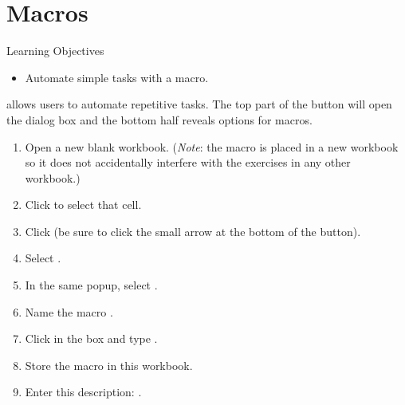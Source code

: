 \section{Macros}

\begin{center}
	\begin{objbox}{Learning Objectives}
		\begin{itemize}
			\setlength{\itemsep}{0pt}
			\setlength{\parskip}{0pt}
			\setlength{\parsep}{0pt}
			
			\item Automate simple tasks with a macro.
			
		\end{itemize}
	\end{objbox}
\end{center}

 allows users to automate repetitive tasks. The top part of the button will open the  dialog box and the bottom half reveals options for macros. 

\begin{enumerate}
	\item Open a new blank workbook. (\textit{Note}: the macro is placed in a new workbook so it does not accidentally interfere with the exercises in any other workbook.)
	\item Click  to select that cell.
	\item Click  (be sure to click the small arrow at the bottom of the  button).
	\item Select .
	\item In the same popup, select .
	\item Name the macro .
	\item Click in the  box and type .
	\item Store the macro in this workbook.
	\item Enter this description: .
\end{enumerate}

